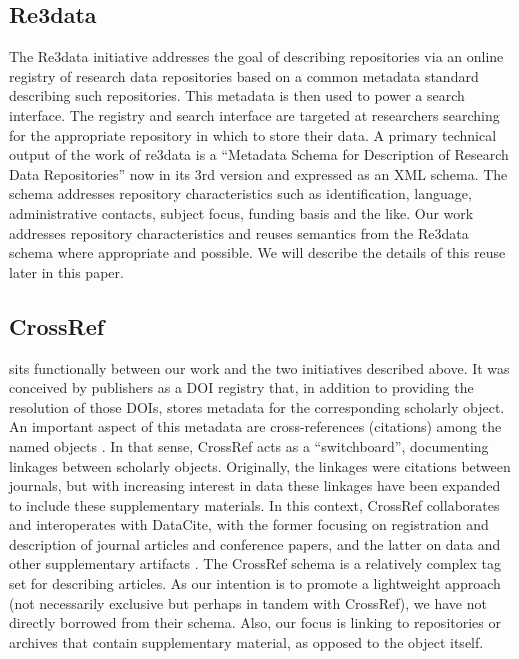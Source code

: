 \subsection{Re3data}
The Re3data initiative \parencite{Rucknagel2015,Re3data.Org2015} addresses the goal of describing repositories via an online registry of research data repositories based on a common metadata standard describing such repositories.
This metadata is then used to power a search interface.  The registry and search interface are targeted at researchers searching for the appropriate repository in which to store their data.
A primary technical output of the work of re3data is a ``Metadata Schema for Description of Research Data Repositories'' now in its 3rd version and expressed as an XML schema.  The schema addresses repository characteristics such as identification,   language, administrative contacts, subject focus, funding basis and the like.  Our work addresses repository characteristics and reuses semantics from the Re3data schema where appropriate and possible.  We will describe the details of this reuse later in this paper.

\subsection{CrossRef}
  sits functionally between our work and the two initiatives described above.  It was conceived by publishers as a DOI registry that, in addition to providing the resolution of those DOIs, stores metadata for the corresponding scholarly object.  An important aspect of this metadata are cross-references (citations) among the named objects \parencite{CrossRef}.  In that sense, CrossRef acts as a ``switchboard'', documenting linkages between scholarly objects. Originally, the linkages were citations between journals, but with increasing interest in data these linkages have been expanded to include these supplementary materials.  In this context, CrossRef collaborates and interoperates with DataCite, with the former focusing on registration and description of journal articles and conference papers, and the latter on data and other supplementary artifacts .  The CrossRef schema is a relatively complex tag set for describing articles.  As our intention is to promote a lightweight approach (not necessarily exclusive but perhaps in tandem with CrossRef), we have not directly borrowed from their schema.  Also, our focus is linking to repositories or archives that contain supplementary material, as opposed to the object itself.

